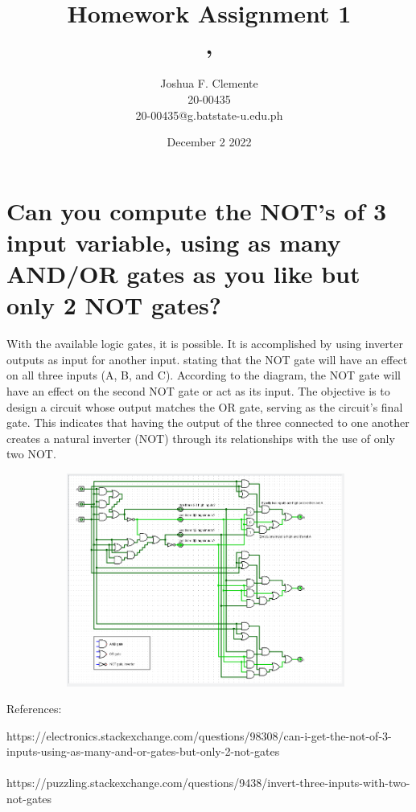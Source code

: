 \documentclass{article}
\title{Homework Assignment 1 \hfill\\
\small
\coursecode, \coursename}
\author{Joshua F. Clemente \hfill\\
        20-00435 \hfill\\
        20-00435@g.batstate-u.edu.ph \hfill\\
}
\date{December 2 2022}
\begin{document}
\maketitle

\section{Can you compute the NOT's of 3 input variable, using as many AND/OR gates as you like but only 2 NOT gates?}

    With the available logic gates, it is possible. It is accomplished by using inverter outputs as input for another input. stating that the NOT gate will have an effect on all three inputs (A, B, and C). According to the diagram, the NOT gate will have an effect on the second NOT gate or act as its input. The objective is to design a circuit whose output matches the OR gate, serving as the circuit's final gate. This indicates that having the output of the three connected to one another creates a natural inverter (NOT) through its relationships with the use of only two NOT.

    
    \begin{figure}[h!]
    \centering
    \includegraphics[height = 7cm, width = 11cm]{sheeesh.png}
    \end{figure}

    References:

    https://electronics.stackexchange.com/questions/98308/can-i-get-the-not-of-3-inputs-using-as-many-and-or-gates-but-only-2-not-gates  \hfill\\
    \hfill\\ https://puzzling.stackexchange.com/questions/9438/invert-three-inputs-with-two-not-gates \hfill\\
\end{document}

